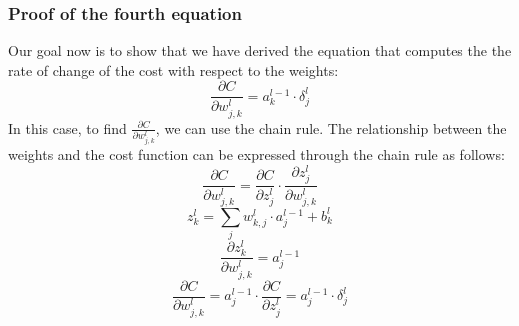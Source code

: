 \documentclass[../main]{subfiles}
\begin{document}
\subsubsection{Proof of the fourth equation}
Our goal now is to show that we have derived the equation that computes the the rate of change of the cost with respect to the weights:
\begin{equation*}
\frac{\partial C}{\partial w_{j,k}^l} = a_{k}^{l-1} \cdot \delta_{j}^l\end{equation*}
In this case, to find $\frac{\partial C}{\partial w_{j,k}^l}$, we can use the chain rule. The relationship between the weights and the cost function can be expressed through the chain rule as follows:
\begin{equation*}
    \frac{\partial C}{\partial w_{j,k}^l} = \frac{\partial C}{\partial z_{j}^l}\cdot\frac{\partial z_{j}^l}{\partial w_{j,k}^l}
\end{equation*}
\begin{equation*}
    z_{k}^{l} = \sum_j w_{k,j}^{l} \cdot a_{j}^{l-1} + b_{k}^{l} 
\end{equation*}
\begin{equation*}
    \frac{\partial z_{k}^{l}}{\partial w_{j,k}^l} = a_{j}^{l-1}
\end{equation*}
\begin{equation*}
    \frac{\partial C}{\partial w_{j,k}^l} = a_{j}^{l-1}\cdot\frac{\partial C}{\partial z_{j}^l}=a_{j}^{l-1}\cdot\delta_{j}^l
\end{equation*}
\end{document}
